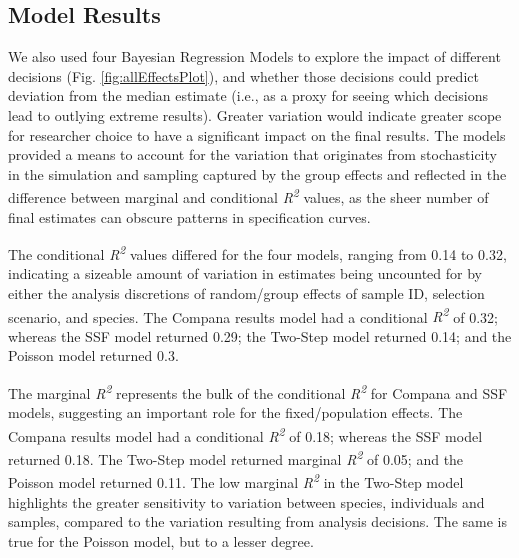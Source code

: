 \documentclass[10pt,a4paper]{article}
\begin{document}
\subsection{Model Results}\label{model-results}

We also used four Bayesian Regression Models to explore the impact of different decisions (Fig. \ref{fig:allEffectsPlot}), and whether those decisions could predict deviation from the median estimate (i.e., as a proxy for seeing which decisions lead to outlying extreme results).
Greater variation would indicate greater scope for researcher choice to have a significant impact on the final results.
The models provided a means to account for the variation that originates from stochasticity in the simulation and sampling captured by the group effects and reflected in the difference between marginal and conditional \emph{R\textsuperscript{2}} values, as the sheer number of final estimates can obscure patterns in specification curves.

The conditional \emph{R\textsuperscript{2}} values differed for the four models, ranging from 0.14 to 0.32, indicating a sizeable amount of variation in estimates being uncounted for by either the analysis discretions of random/group effects of sample ID, selection scenario, and species.
The Compana results model had a conditional \emph{R\textsuperscript{2}} of 0.32; whereas the SSF model returned 0.29; the Two-Step model returned 0.14; and the Poisson model returned 0.3.

The marginal \emph{R\textsuperscript{2}} represents the bulk of the conditional \emph{R\textsuperscript{2}} for Compana and SSF models, suggesting an important role for the fixed/population effects.
The Compana results model had a conditional \emph{R\textsuperscript{2}} of 0.18; whereas the SSF model returned 0.18.
The Two-Step model returned marginal \emph{R\textsuperscript{2}} of 0.05; and the Poisson model returned 0.11.
The low marginal \emph{R\textsuperscript{2}} in the Two-Step model highlights the greater sensitivity to variation between species, individuals and samples, compared to the variation resulting from analysis decisions.
The same is true for the Poisson model, but to a lesser degree.
\end{document}
